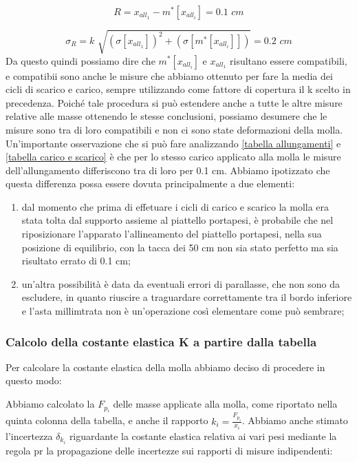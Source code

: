 \begin{equation*}
	R = x_{all_1} - m^*[x_{all_i}] = 0.1 \,\,cm
\end{equation*}

\begin{equation*}
	\sigma_{R} = k\,\, \sqrt{(\sigma[x_{all_1}])^2 + (\sigma[m^*[x_{all_i}]])} = 0.2 \,\,cm
\end{equation*}
%
Da questo quindi possiamo dire che $m^*[x_{all_i}]$ e $x_{all_1}$ risultano essere compatibili, e compatibii sono anche le misure che abbiamo ottenuto per fare la media dei cicli di scarico e carico, sempre utilizzando come fattore di copertura il k scelto in precedenza.
Poiché tale procedura si può estendere anche a tutte le altre misure relative alle masse ottenendo le stesse conclusioni, possiamo desumere che le misure sono tra di loro compatibili e non ci sono state deformazioni della molla.
Un'importante osservazione che si può fare analizzando \ref{tabella allungamenti} e \ref{tabella carico e scarico} è che per lo stesso carico applicato alla molla le misure dell'allungamento differiscono tra di loro per 0.1 cm. Abbiamo ipotizzato che questa differenza possa essere dovuta principalmente a due elementi:

\begin{enumerate}
	\item{dal momento che prima di effetuare i cicli di carico e scarico la molla era stata tolta dal supporto assieme al piattello portapesi, è probabile che nel riposizionare l'apparato l'allineamento del piattello portapesi, nella sua posizione di equilibrio, con la tacca dei 50 cm non sia stato perfetto ma sia risultato errato di 0.1 cm;}
	\item{un'altra possibilità è data da eventuali errori di parallasse, che non sono da escludere, in quanto riuscire a traguardare correttamente tra il bordo inferiore e l'asta millimtrata non è un'operazione così elementare come può sembrare;}
\end{enumerate}

\subsubsection{Calcolo della costante elastica K a partire dalla tabella}
Per calcolare la costante elastica della molla abbiamo deciso di procedere in questo modo:

Abbiamo calcolato la $F_{p_{i}}$ delle masse applicate alla molla, come riportato nella quinta colonna della tabella, e anche il rapporto $k_{i} = \frac{F_{p_{i}}}{x_{i}}$. Abbiamo anche stimato l'incertezza $\delta_{k_{i}}$ riguardante la costante elastica relativa ai vari pesi mediante la regola pr la propagazione delle incertezze sui rapporti di misure indipendenti:


